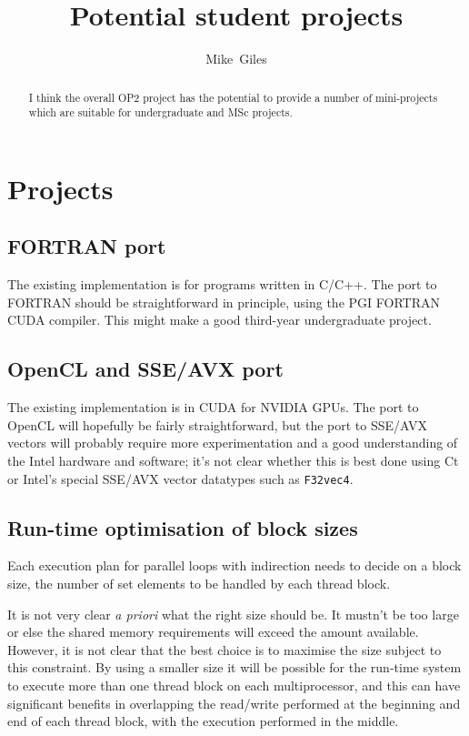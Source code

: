 \documentclass[12pt]{article}
\begin{document}
\title{Potential student projects}
\author{Mike~Giles}

\maketitle



\begin{abstract}
I think the overall OP2 project has the potential to provide a 
number of mini-projects which are suitable for undergraduate 
and MSc projects.
\end{abstract}


\section{Projects}


\subsection{FORTRAN port}

The existing implementation is for programs written in C/C++.  
The port to FORTRAN should be straightforward in principle, using 
the PGI FORTRAN CUDA compiler.  This might make a good 
third-year undergraduate project.

\subsection{OpenCL and SSE/AVX port}

The existing implementation is in CUDA for NVIDIA GPUs.  The port 
to OpenCL will hopefully be fairly straightforward, but the port 
to SSE/AVX vectors will probably require more experimentation and 
a good understanding of the Intel hardware and software; it's not 
clear whether this is best done using Ct or Intel's special SSE/AVX 
vector datatypes such as {\tt F32vec4}.


\subsection{Run-time optimisation of block sizes}

Each execution plan for parallel loops with indirection needs to 
decide on a block size, the number of set elements to be handled by
each thread block.

It is not very clear {\it a priori} what the right size should be.  
It mustn't be too large or else the shared memory requirements will 
exceed the amount available.  However, it is not clear that the best
choice is to maximise the size subject to this constraint.  By using 
a smaller size it will be possible for the run-time system to execute
more than one thread block on each multiprocessor, and this can have
significant benefits in overlapping the read/write performed at the 
beginning and end of each thread block, with the execution performed 
in the middle.
\end{document}
